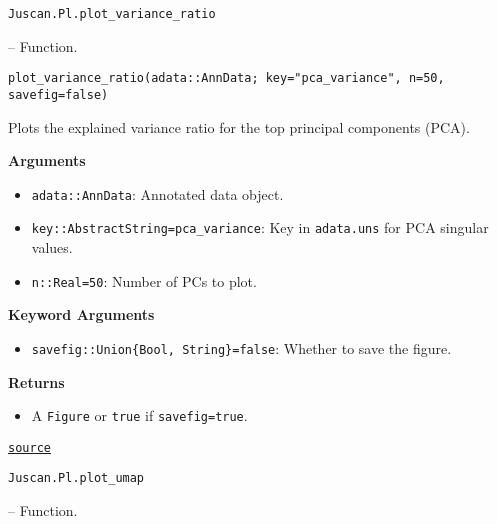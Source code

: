 \documentclass[oneside]{memoir}
\begin{document}
\hypertarget{7149118763484987526}{\texttt{Juscan.Pl.plot\_variance\_ratio}}  -- {Function.}

\begin{adjustwidth}{2em}{0pt}


\begin{verbatim}
plot_variance_ratio(adata::AnnData; key="pca_variance", n=50, savefig=false)
\end{verbatim}

Plots the explained variance ratio for the top principal components (PCA).

\textbf{Arguments}

\begin{itemize}
\item \texttt{adata::AnnData}: Annotated data object.


\item \texttt{key::AbstractString={\textquotedbl}pca\_variance{\textquotedbl}}: Key in \texttt{adata.uns} for PCA singular values.


\item \texttt{n::Real=50}: Number of PCs to plot.

\end{itemize}
\textbf{Keyword Arguments}

\begin{itemize}
\item \texttt{savefig::Union\{Bool, String\}=false}: Whether to save the figure.

\end{itemize}
\textbf{Returns}

\begin{itemize}
\item A \texttt{Figure} or \texttt{true} if \texttt{savefig=true}.

\end{itemize}


\href{https://github.com/zehua0417/Juscan.jl/blob/393ad1b827b678ea98a738f92af658ee9ed9a403/src/plots/plots.jl#L294-L310}{\texttt{source}}


\end{adjustwidth}
\hypertarget{5741255501892763485}{\texttt{Juscan.Pl.plot\_umap}}  -- {Function.}
\end{document}
